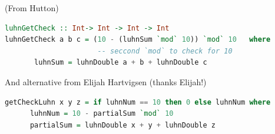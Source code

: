 \documentclass{article}
\begin{document}
\begin{solution}
(From Hutton) 
\begin{lstlisting}[language=Haskell]
luhnGetCheck :: Int-> Int -> Int -> Int
luhnGetCheck a b c = (10 - (luhnSum `mod` 10)) `mod` 10   where  
                      -- seccond `mod` to check for 10
       luhnSum = luhnDouble a + b + luhnDouble c 

\end{lstlisting}
And alternative from Elijah Hartvigsen (thanks Elijah!)
\begin{lstlisting}[language=Haskell]
    getCheckLuhn x y z = if luhnNum == 10 then 0 else luhnNum where
      luhnNum = 10 - partialSum `mod` 10
      partialSum = luhnDouble x + y + luhnDouble z
  \end{lstlisting}
\end{solution}
\end{document}
